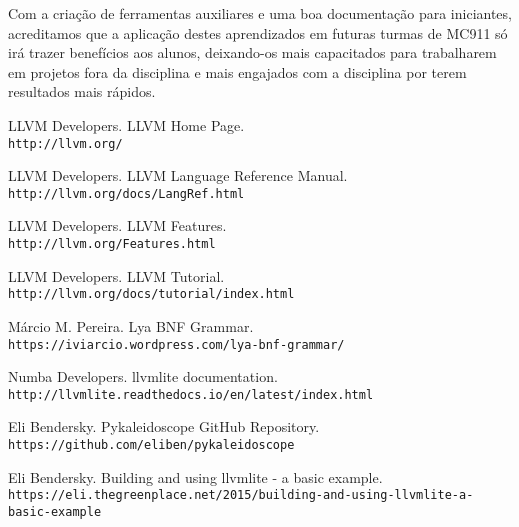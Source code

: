 \documentclass[11pt, oneside, titlepage]{report}
\begin{document}
      Com a criação de ferramentas auxiliares e uma boa documentação para iniciantes, acreditamos que a aplicação destes
      aprendizados em futuras turmas de MC911 só irá trazer benefícios aos alunos, deixando-os mais capacitados para
      trabalharem em projetos fora da disciplina e mais engajados com a disciplina por terem resultados mais rápidos.

    
    \begin{thebibliography}{9}

      LLVM Developers. LLVM Home Page.\\
      \texttt{http://llvm.org/}

      LLVM Developers. LLVM Language Reference Manual.\\
      \texttt{http://llvm.org/docs/LangRef.html}

      LLVM Developers. LLVM Features.\\
      \texttt{http://llvm.org/Features.html}

      LLVM Developers. LLVM Tutorial.\\
      \texttt{http://llvm.org/docs/tutorial/index.html}

      Márcio M. Pereira. Lya BNF Grammar.\\
      \texttt{https://iviarcio.wordpress.com/lya-bnf-grammar/}

      Numba Developers. llvmlite documentation.\\
      \texttt{http://llvmlite.readthedocs.io/en/latest/index.html}

      Eli Bendersky. Pykaleidoscope GitHub Repository.\\
      \texttt{https://github.com/eliben/pykaleidoscope}

      Eli Bendersky. Building and using llvmlite - a basic example.\\
      \texttt{https://eli.thegreenplace.net/2015/building-and-using-llvmlite-a-basic-example}

    \end{thebibliography}

  
\end{document}
